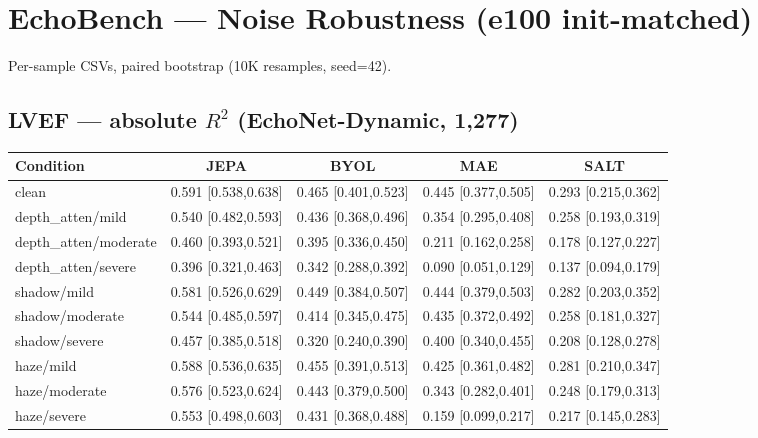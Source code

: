 \documentclass{article}
\begin{document}
\section{EchoBench --- Noise Robustness (e100 init-matched)}

Per-sample CSVs, paired bootstrap (10K resamples, seed=42).

\subsection{LVEF --- absolute $R^2$ (EchoNet-Dynamic, 1{,}277)}

\begin{center}
\small
\begin{tabular}{lcccc}
\toprule
Condition & JEPA & BYOL & MAE & SALT \\
\midrule
clean                  & 0.591 [0.538,0.638] & 0.465 [0.401,0.523] & 0.445 [0.377,0.505] & 0.293 [0.215,0.362] \\
depth\_atten/mild      & 0.540 [0.482,0.593] & 0.436 [0.368,0.496] & 0.354 [0.295,0.408] & 0.258 [0.193,0.319] \\
depth\_atten/moderate  & 0.460 [0.393,0.521] & 0.395 [0.336,0.450] & 0.211 [0.162,0.258] & 0.178 [0.127,0.227] \\
depth\_atten/severe    & 0.396 [0.321,0.463] & 0.342 [0.288,0.392] & 0.090 [0.051,0.129] & 0.137 [0.094,0.179] \\
shadow/mild            & 0.581 [0.526,0.629] & 0.449 [0.384,0.507] & 0.444 [0.379,0.503] & 0.282 [0.203,0.352] \\
shadow/moderate        & 0.544 [0.485,0.597] & 0.414 [0.345,0.475] & 0.435 [0.372,0.492] & 0.258 [0.181,0.327] \\
shadow/severe          & 0.457 [0.385,0.518] & 0.320 [0.240,0.390] & 0.400 [0.340,0.455] & 0.208 [0.128,0.278] \\
haze/mild              & 0.588 [0.536,0.635] & 0.455 [0.391,0.513] & 0.425 [0.361,0.482] & 0.281 [0.210,0.347] \\
haze/moderate          & 0.576 [0.523,0.624] & 0.443 [0.379,0.500] & 0.343 [0.282,0.401] & 0.248 [0.179,0.313] \\
haze/severe            & 0.553 [0.498,0.603] & 0.431 [0.368,0.488] & 0.159 [0.099,0.217] & 0.217 [0.145,0.283] \\
\bottomrule
\end{tabular}
\end{center}
\end{document}

